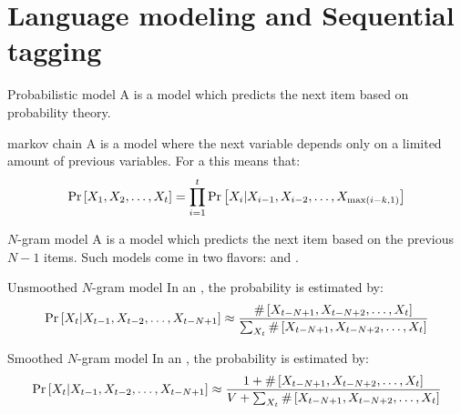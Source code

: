 \section{Language modeling and Sequential tagging}
\begin{df}{Probabilistic model}
A \sb{} is a model which predicts the next item based on probability theory.
\end{df}
\begin{df}{markov chain}
A \sb{} is a model where the next variable depends only on a limited amount of previous variables. For a  this means that:
\begin{equation}
\Pr\left[X_1,X_2,\ldots,X_t\right]=\displaystyle\prod_{i=1}^t{\Pr\left[X_i|X_{i-1},X_{i-2},\ldots,X_{\max\left(i-k,1\right)}\right]}
\end{equation}
\end{df}
\begin{df}{$N$-gram model}
A \sb{} is a model which predicts the next item based on the previous $N-1$ items. Such models come in two flavors:  and .
\end{df}
\begin{df}{Unsmoothed $N$-gram model}
In an \sb{}, the probability is estimated by:
\begin{equation}
\Pr\left[X_t|X_{t-1},X_{t-2},\ldots,X_{t-N+1}\right]\approx\displaystyle\frac{\#\left[X_{t-N+1},X_{t-N+2},\ldots,X_{t}\right]}{\sum_{X_t}\#\left[X_{t-N+1},X_{t-N+2},\ldots,X_{t}\right]}
\end{equation}
\end{df}
\begin{df}{Smoothed $N$-gram model}
In an \sb{}, the probability is estimated by:
\begin{equation}
\Pr\left[X_t|X_{t-1},X_{t-2},\ldots,X_{t-N+1}\right]\approx\displaystyle\frac{1+\#\left[X_{t-N+1},X_{t-N+2},\ldots,X_{t}\right]}{V+\sum_{X_t}\#\left[X_{t-N+1},X_{t-N+2},\ldots,X_{t}\right]}
\end{equation}
\end{df}
